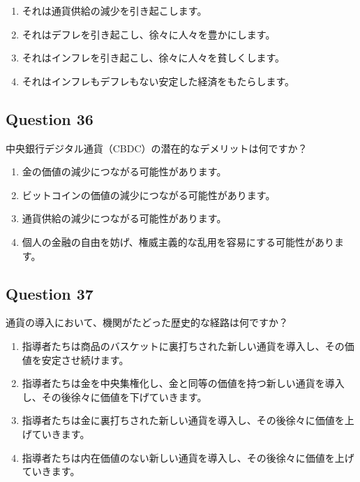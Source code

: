 \documentclass[12pt,a4paper]{article}
\begin{document}
\begin{enumerate}[label=\Alph*., leftmargin=*]
\item それは通貨供給の減少を引き起こします。
\item それはデフレを引き起こし、徐々に人々を豊かにします。
\item それはインフレを引き起こし、徐々に人々を貧しくします。
\item それはインフレもデフレもない安定した経済をもたらします。
\end{enumerate}

\bigskip


\subsection*{Question 36}
中央銀行デジタル通貨（CBDC）の潜在的なデメリットは何ですか？

\begin{enumerate}[label=\Alph*., leftmargin=*]
\item 金の価値の減少につながる可能性があります。
\item ビットコインの価値の減少につながる可能性があります。
\item 通貨供給の減少につながる可能性があります。
\item 個人の金融の自由を妨げ、権威主義的な乱用を容易にする可能性があります。
\end{enumerate}

\bigskip


\subsection*{Question 37}
通貨の導入において、機関がたどった歴史的な経路は何ですか？

\begin{enumerate}[label=\Alph*., leftmargin=*]
\item 指導者たちは商品のバスケットに裏打ちされた新しい通貨を導入し、その価値を安定させ続けます。
\item 指導者たちは金を中央集権化し、金と同等の価値を持つ新しい通貨を導入し、その後徐々に価値を下げていきます。
\item 指導者たちは金に裏打ちされた新しい通貨を導入し、その後徐々に価値を上げていきます。
\item 指導者たちは内在価値のない新しい通貨を導入し、その後徐々に価値を上げていきます。
\end{enumerate}

\bigskip
\end{document}
